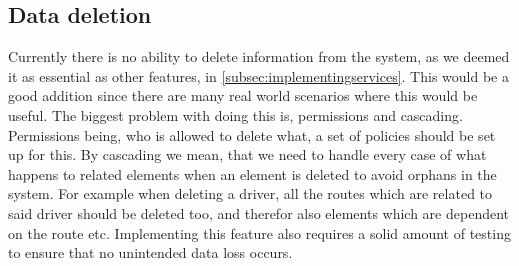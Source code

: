 \subsection{Data deletion}
Currently there is no ability to delete information from the system, as we deemed it as essential as other features, in \cref{subsec:implementingservices}.
This would be a good addition since there are many real world scenarios where this would be useful. 
The biggest problem with doing this is, permissions and cascading.
Permissions being, who is allowed to delete what, a set of policies should be set up for this.
By cascading we mean, that we need to handle every case of what happens to related elements when an element is deleted to avoid orphans in the system.
For example when deleting a driver, all the routes which are related to said driver should be deleted too, and therefor also elements which are dependent on the route etc.
Implementing this feature also requires a solid amount of testing to ensure that no unintended data loss occurs. 

